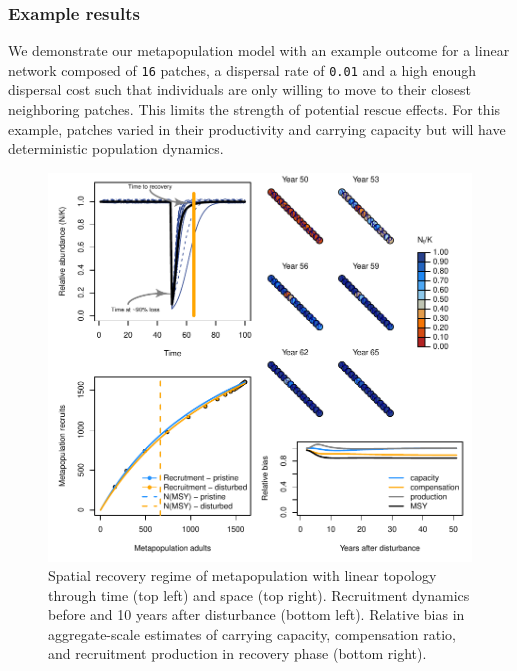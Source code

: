 \documentclass[]{article}
\begin{document}
\hypertarget{example-results}{%
\subsubsection{Example results}\label{example-results}}

We demonstrate our metapopulation model with an example outcome for a
linear network composed of \texttt{16} patches, a dispersal rate of
\texttt{0.01} and a high enough dispersal cost such that individuals are
only willing to move to their closest neighboring patches. This limits
the strength of potential rescue effects. For this example, patches
varied in their productivity and carrying capacity but will have
deterministic population dynamics.

\begin{figure}[H]

{\centering \includegraphics{Managing_for_ecological_surprises_in_metapopulations_makeHTML_files/figure-latex/example results1-1} 

}

\caption{Spatial recovery regime of metapopulation with linear topology through time (top left) and space (top right). Recruitment dynamics before and 10 years after disturbance (bottom left). Relative bias in aggregate-scale estimates of carrying capacity, compensation ratio, and recruitment production in recovery phase (bottom right).}\label{fig:example results1}
\end{figure}
\end{document}
